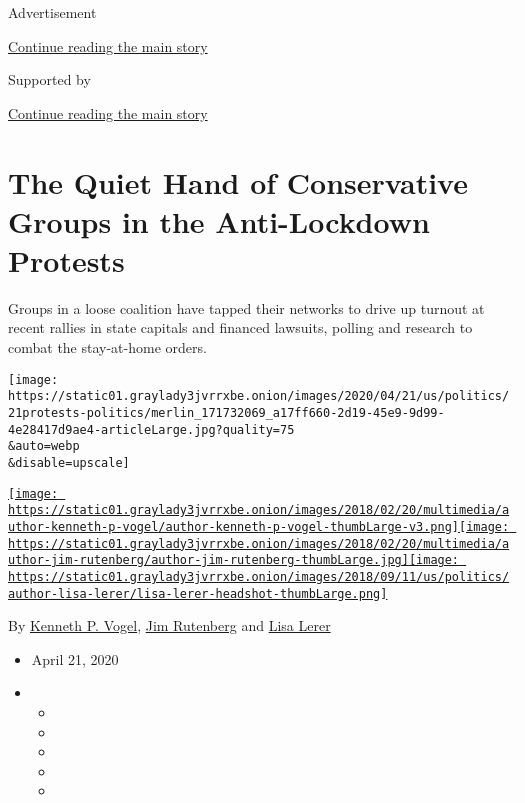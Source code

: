 Advertisement

\protect\hyperlink{after-top}{Continue reading the main story}

Supported by

\protect\hyperlink{after-sponsor}{Continue reading the main story}

\hypertarget{the-quiet-hand-of-conservative-groups-in-the-anti-lockdown-protests}{%
\section{The Quiet Hand of Conservative Groups in the Anti-Lockdown
Protests}\label{the-quiet-hand-of-conservative-groups-in-the-anti-lockdown-protests}}

Groups in a loose coalition have tapped their networks to drive up
turnout at recent rallies in state capitals and financed lawsuits,
polling and research to combat the stay-at-home orders.

\texttt{[image: https://static01.graylady3jvrrxbe.onion/images/2020/04/21/us/politics/21protests-politics/merlin\_171732069\_a17ff660-2d19-45e9-9d99-4e28417d9ae4-articleLarge.jpg?quality=75\\\&auto=webp\\\&disable=upscale]}

\href{https://www.nytimes3xbfgragh.onion/by/kenneth-p-vogel}{\texttt{[image: https://static01.graylady3jvrrxbe.onion/images/2018/02/20/multimedia/author-kenneth-p-vogel/author-kenneth-p-vogel-thumbLarge-v3.png]}}\href{https://www.nytimes3xbfgragh.onion/by/jim-rutenberg}{\texttt{[image: https://static01.graylady3jvrrxbe.onion/images/2018/02/20/multimedia/author-jim-rutenberg/author-jim-rutenberg-thumbLarge.jpg]}}\href{https://www.nytimes3xbfgragh.onion/by/lisa-lerer}{\texttt{[image: https://static01.graylady3jvrrxbe.onion/images/2018/09/11/us/politics/author-lisa-lerer/lisa-lerer-headshot-thumbLarge.png]}}

By \href{https://www.nytimes3xbfgragh.onion/by/kenneth-p-vogel}{Kenneth
P. Vogel},
\href{https://www.nytimes3xbfgragh.onion/by/jim-rutenberg}{Jim
Rutenberg} and
\href{https://www.nytimes3xbfgragh.onion/by/lisa-lerer}{Lisa Lerer}

\begin{itemize}
\item
  April 21, 2020
\item
  \begin{itemize}
  \item
  \item
  \item
  \item
  \item
  \end{itemize}
\end{itemize}

